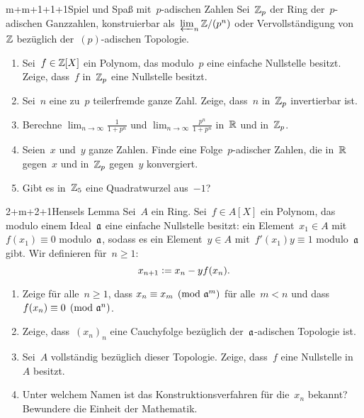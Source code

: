 \documentclass[entwurf]{uebblatt}
\begin{document}

\begin{aufgabe}{m+m+1+1+1}{Spiel und Spaß mit~$p$-adischen Zahlen}
Sei~$\mathbb{Z}_p$ der Ring der~$p$-adischen Ganzzahlen, konstruierbar
als~$\varprojlim_n \mathbb{Z}/(p^n)$ oder Vervollständigung von~$\mathbb{Z}$ bezüglich
der~$(p)$-adischen Topologie.
\begin{enumerate}
\item Sei~$f \in \mathbb{Z}[X]$ ein Polynom, das modulo~$p$ eine einfache Nullstelle
besitzt. Zeige, dass~$f$ in~$\mathbb{Z}_p$ eine Nullstelle besitzt.
\item Sei~$n$ eine zu~$p$ teilerfremde ganze Zahl. Zeige, dass~$n$ in~$\mathbb{Z}_p$
invertierbar ist.
\item Berechne $\lim_{n \to \infty} \frac{1}{1 + p^n}$ und $\lim_{n \to \infty}
\frac{p^n}{1 + p^n}$ in~$\mathbb{R}$ und in~$\mathbb{Z}_p$.
\item Seien~$x$ und~$y$ ganze Zahlen. Finde eine Folge~$p$-adischer Zahlen, die
in~$\mathbb{R}$ gegen~$x$ und in~$\mathbb{Z}_p$ gegen~$y$ konvergiert.
\item Gibt es in~$\mathbb{Z}_5$ eine Quadratwurzel aus~$-1$?
\end{enumerate}
\end{aufgabe}

\begin{aufgabe}{2+m+2+1}{Hensels Lemma}
Sei~$A$ ein Ring. Sei~$f \in A[X]$ ein
Polynom, das modulo einem Ideal~$\mathfrak{a}$ eine einfache Nullstelle besitzt: ein Element~$x_1
\in A$ mit~$f(x_1) \equiv 0$ modulo~$\mathfrak{a}$, sodass es ein Element~$y \in A$
mit~$f'(x_1) y \equiv 1$ modulo~$\mathfrak{a}$ gibt.
Wir definieren für~$n \geq 1$: \[ x_{n+1} \vcentcolon= x_n - y f(x_n). \]
\begin{enumerate}
\item Zeige für alle~$n \geq 1$, dass $x_n \equiv x_m \pmod{\mathfrak{a}^m}$ für
alle~$m < n$ und dass~$f(x_n) \equiv 0 \pmod{\mathfrak{a}^n}$.
\item Zeige, dass~$(x_n)_n$ eine Cauchyfolge bezüglich der~$\mathfrak{a}$-adischen
Topologie ist.
\item Sei~$A$ vollständig bezüglich dieser Topologie. Zeige,
dass~$f$ eine Nullstelle in~$A$ besitzt.
\item Unter welchem Namen ist das Konstruktionsverfahren für die~$x_n$ bekannt?
Bewundere die Einheit der Mathematik.
\end{enumerate}
\end{aufgabe}
\end{document}
